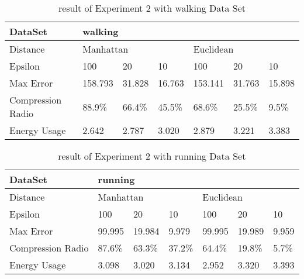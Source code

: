 \documentclass[10pt, conference, compsocconf]{IEEEtran}
\begin{document}
\begin{table}[]
    \begin{center}
    \caption{result of Experiment 2 with walking Data Set}
    \begin{tabular}{|l|l|l|l|l|l|l|}
    \hline
    DataSet           & \multicolumn{6}{l|}{walking}                                   \\\hline
    Distance          & \multicolumn{3}{l|}{Manhattan} & \multicolumn{3}{l|}{Euclidean} \\\hline
    Epsilon           & 100       & 20      & 10      & 100       & 20      & 10      \\\hline
    Max Error         & 158.793   & 31.828  & 16.763  & 153.141   & 31.763  & 15.898  \\\hline
    Compression Radio & 88.9\%    & 66.4\%  & 45.5\%  & 68.6\%    & 25.5\%  & 9.5\%   \\\hline
    Energy Usage      & 2.642     & 2.787   & 3.020   & 2.879     & 3.221   & 3.383   \\\hline
    \end{tabular}
    \end{center}
\end{table}

\begin{table}[]
    \begin{center}
    \caption{result of Experiment 2 with running Data Set}
    \begin{tabular}{|l|l|l|l|l|l|l|}
    \hline
    DataSet           & \multicolumn{6}{l|}{running}                                   \\\hline
    Distance          & \multicolumn{3}{l|}{Manhattan} & \multicolumn{3}{l|}{Euclidean} \\\hline
    Epsilon           & 100      & 20       & 10      & 100      & 20       & 10      \\\hline
    Max Error         & 99.995   & 19.984   & 9.979   & 99.995   & 19.989   & 9.959   \\\hline
    Compression Radio & 87.6\%   & 63.3\%   & 37.2\%  & 64.4\%   & 19.8\%   & 5.7\%   \\\hline
    Energy Usage      & 3.098    & 3.020    & 3.134   & 2.952    & 3.320    & 3.393   \\\hline
    \end{tabular}
    \end{center}
\end{table}



\end{document}

